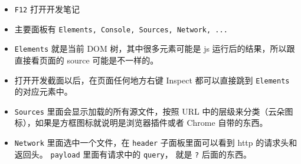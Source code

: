 

\begin{issues}
\issueDraft
\end{issues}

\begin{itemize}
\item \verb`F12` 打开开发笔记
\item 主要面板有 \verb`Elements, Console, Sources, Network, ...`
\item \verb`Elements` 就是当前 DOM 树，其中很多元素可能是 js 运行后的结果，所以跟直接看页面的 source 可能是不一样的。
\item 打开开发截面以后，在页面任何地方右键 Inspect 都可以直接跳到 \verb`Elements` 的对应元素中。
\item \verb`Sources` 里面会显示加载的所有源文件，按照 URL 中的层级来分类（云朵图标），如果是方框图标就说明是浏览器插件或者 Chrome 自带的东西。
\item \verb`Network` 里面选中一个文件，在 \verb`header` 子面板里面可以看到 http 的请求头和返回头。 \verb`payload` 里面有请求中的 \verb`query`， 就是 \verb`?` 后面的东西。
\end{itemize}
